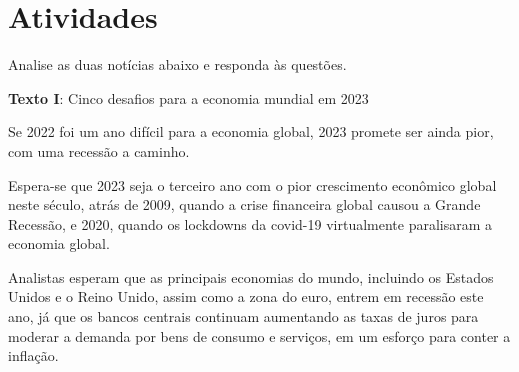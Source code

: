 {%

\section{Atividades}

Analise as duas notícias abaixo e responda às questões.

\begin{myquote}

\textbf{Texto I}: Cinco desafios para a economia mundial em 2023

Se 2022 foi um ano difícil para a economia global, 2023 promete ser
ainda pior, com uma recessão a caminho.

Espera-se que 2023 seja o terceiro ano com o pior crescimento econômico
global neste século, atrás de 2009, quando a crise financeira global
causou a Grande Recessão, e 2020, quando os lockdowns da covid-19
virtualmente paralisaram a economia global.

Analistas esperam que as principais economias do mundo, incluindo os
Estados Unidos e o Reino Unido, assim como a zona do euro, entrem em
recessão este ano, já que os bancos centrais continuam aumentando as
taxas de juros para moderar a demanda por bens de consumo e serviços, em
um esforço para conter a inflação. 


\end{myquote}

}
